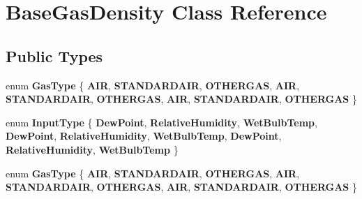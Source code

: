 \hypertarget{class_base_gas_density}{}\section{Base\+Gas\+Density Class Reference}
\label{class_base_gas_density}
\subsection*{Public Types}
\begin{DoxyCompactItemize}
\item 
\mbox{\label{class_base_gas_density_afb215e48f6193462521b7e8d47306ed3}} 
enum {\bfseries Gas\+Type} \{ \newline
{\bfseries A\+IR}, 
{\bfseries S\+T\+A\+N\+D\+A\+R\+D\+A\+IR}, 
{\bfseries O\+T\+H\+E\+R\+G\+AS}, 
{\bfseries A\+IR}, 
\newline
{\bfseries S\+T\+A\+N\+D\+A\+R\+D\+A\+IR}, 
{\bfseries O\+T\+H\+E\+R\+G\+AS}, 
{\bfseries A\+IR}, 
{\bfseries S\+T\+A\+N\+D\+A\+R\+D\+A\+IR}, 
\newline
{\bfseries O\+T\+H\+E\+R\+G\+AS}
 \}
\item 
\mbox{\label{class_base_gas_density_a54f846cc4683a49d3904a40fe2986772}} 
enum {\bfseries Input\+Type} \{ \newline
{\bfseries Dew\+Point}, 
{\bfseries Relative\+Humidity}, 
{\bfseries Wet\+Bulb\+Temp}, 
{\bfseries Dew\+Point}, 
\newline
{\bfseries Relative\+Humidity}, 
{\bfseries Wet\+Bulb\+Temp}, 
{\bfseries Dew\+Point}, 
{\bfseries Relative\+Humidity}, 
\newline
{\bfseries Wet\+Bulb\+Temp}
 \}
\item 
\mbox{\label{class_base_gas_density_afb215e48f6193462521b7e8d47306ed3}} 
enum {\bfseries Gas\+Type} \{ \newline
{\bfseries A\+IR}, 
{\bfseries S\+T\+A\+N\+D\+A\+R\+D\+A\+IR}, 
{\bfseries O\+T\+H\+E\+R\+G\+AS}, 
{\bfseries A\+IR}, 
\newline
{\bfseries S\+T\+A\+N\+D\+A\+R\+D\+A\+IR}, 
{\bfseries O\+T\+H\+E\+R\+G\+AS}, 
{\bfseries A\+IR}, 
{\bfseries S\+T\+A\+N\+D\+A\+R\+D\+A\+IR}, 
\newline
{\bfseries O\+T\+H\+E\+R\+G\+AS}
 \}
\item 
\mbox{\label{class_base_gas_density_a54f846cc4683a49d3904a40fe2986772}} 

\end{DoxyCompactItemize}

